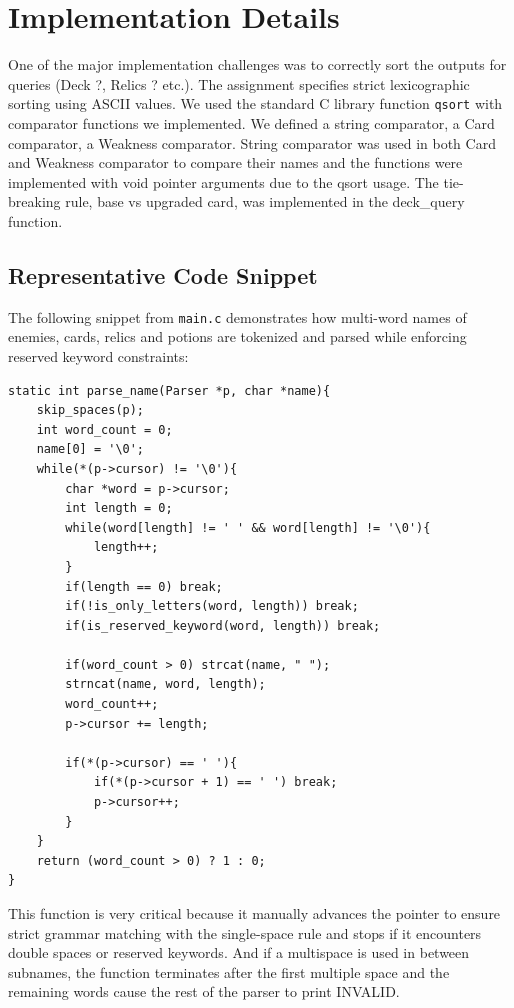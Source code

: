 \documentclass[a4paper,12pt]{article}
\begin{document}
\section{Implementation Details}

One of the major implementation challenges was to correctly sort the outputs for queries (Deck ?, Relics ? etc.). The assignment specifies strict lexicographic sorting using ASCII values. We used the standard C library function \texttt{qsort} with comparator functions we implemented. We defined a string comparator, a Card comparator, a Weakness comparator. String comparator was used in both Card and Weakness comparator to compare their names and the functions were implemented with void pointer arguments due to the qsort usage. The tie-breaking rule, base vs upgraded card, was implemented in the deck\_query function.

\subsection{Representative Code Snippet}

The following snippet from \texttt{main.c} demonstrates how multi-word names of enemies, cards, relics and potions are tokenized and parsed while enforcing reserved keyword constraints:

\begin{lstlisting}[style=CStyle]
static int parse_name(Parser *p, char *name){
    skip_spaces(p);
    int word_count = 0;
    name[0] = '\0';
    while(*(p->cursor) != '\0'){
        char *word = p->cursor;
        int length = 0;
        while(word[length] != ' ' && word[length] != '\0'){
            length++;
        }
        if(length == 0) break;
        if(!is_only_letters(word, length)) break;
        if(is_reserved_keyword(word, length)) break;
        
        if(word_count > 0) strcat(name, " ");
        strncat(name, word, length);
        word_count++;
        p->cursor += length;
        
        if(*(p->cursor) == ' '){
            if(*(p->cursor + 1) == ' ') break;
            p->cursor++;
        }
    }
    return (word_count > 0) ? 1 : 0;
}
\end{lstlisting}

This function is very critical because it manually advances the pointer to ensure strict grammar matching with the single-space rule and stops if it encounters double spaces or reserved keywords. And if a multispace is used in between subnames, the function terminates after the first multiple space and the remaining words cause the rest of the parser to print INVALID.
\end{document}

